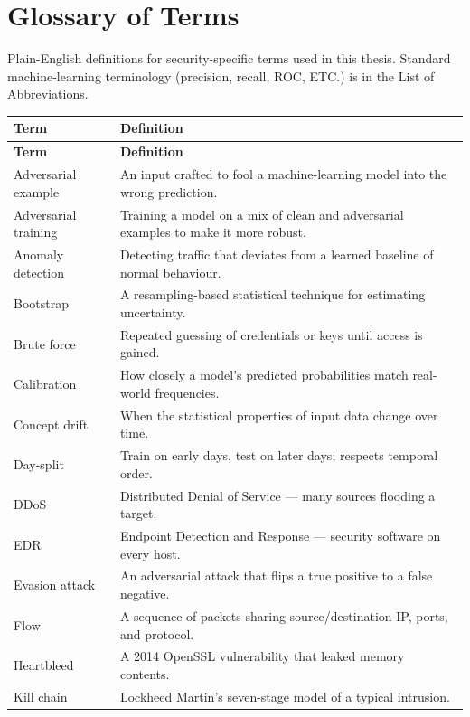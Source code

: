 \chapter{Glossary of Terms}
\label{app:glossary}

Plain-English definitions for security-specific terms used in this
thesis. Standard machine-learning terminology (precision, recall, ROC,
ETC.) is in the List of Abbreviations.

\begin{longtable}{p{4.0cm}p{11.0cm}}
    \toprule
    \textbf{Term} & \textbf{Definition} \\
    \midrule
    \endfirsthead
    \toprule
    \textbf{Term} & \textbf{Definition} \\
    \midrule
    \endhead
    Adversarial example & An input crafted to fool a machine-learning model into the wrong prediction. \\
    Adversarial training & Training a model on a mix of clean and adversarial examples to make it more robust. \\
    Anomaly detection & Detecting traffic that deviates from a learned baseline of normal behaviour. \\
    Bootstrap & A resampling-based statistical technique for estimating uncertainty. \\
    Brute force & Repeated guessing of credentials or keys until access is gained. \\
    Calibration & How closely a model's predicted probabilities match real-world frequencies. \\
    Concept drift & When the statistical properties of input data change over time. \\
    Day-split & Train on early days, test on later days; respects temporal order. \\
    DDoS & Distributed Denial of Service --- many sources flooding a target. \\
    EDR & Endpoint Detection and Response --- security software on every host. \\
    Evasion attack & An adversarial attack that flips a true positive to a false negative. \\
    Flow & A sequence of packets sharing source/destination IP, ports, and protocol. \\
    Heartbleed & A 2014 OpenSSL vulnerability that leaked memory contents. \\
    Kill chain & Lockheed Martin's seven-stage model of a typical intrusion. \\

\end{longtable}
